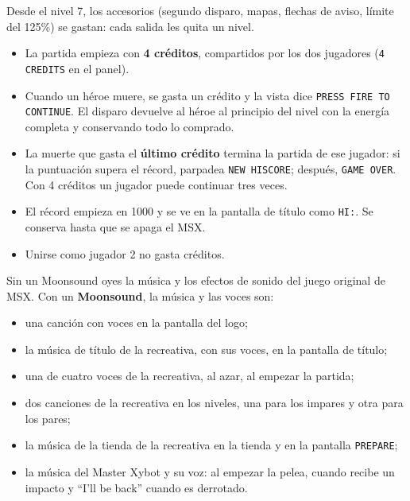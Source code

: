 \medskip
Desde el nivel 7, los accesorios (segundo disparo, mapas, flechas de aviso, límite del 125\%) se gastan: cada salida les quita un nivel.


\begin{itemize}
\item La partida empieza con \textbf{4 créditos}, compartidos por los dos jugadores (\texttt{4 CREDITS} en el panel).
\item Cuando un héroe muere, se gasta un crédito y la vista dice \texttt{PRESS FIRE TO CONTINUE}. El disparo devuelve al héroe al
principio del nivel con la energía completa y conservando todo lo comprado.
\item La muerte que gasta el \textbf{último crédito} termina la partida de ese jugador: si la puntuación supera el récord, parpadea
\texttt{NEW HISCORE}; después, \texttt{GAME OVER}. Con 4 créditos un jugador puede continuar tres veces.
\item El récord empieza en 1000 y se ve en la pantalla de título como \texttt{HI:}. Se conserva hasta que se apaga el MSX.
\item Unirse como jugador 2 no gasta créditos.
\end{itemize}


Sin un Moonsound oyes la música y los efectos de sonido del juego original de MSX. Con un \textbf{Moonsound}, la música y las voces son:

\begin{itemize}
\item una canción con voces en la pantalla del logo;
\item la música de título de la recreativa, con sus voces, en la pantalla de título;
\item una de cuatro voces de la recreativa, al azar, al empezar la partida;
\item dos canciones de la recreativa en los niveles, una para los impares y otra para los pares;
\item la música de la tienda de la recreativa en la tienda y en la pantalla \texttt{PREPARE};
\item la música del Master Xybot y su voz: al empezar la pelea, cuando recibe un impacto y ``I'll be back'' cuando es derrotado.
\end{itemize}

